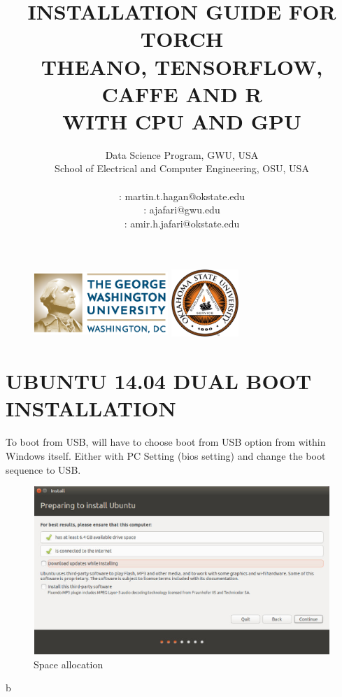 \documentclass[12pt]{article}
\title{\textbf{INSTALLATION GUIDE FOR TORCH}\\\textbf{THEANO, TENSORFLOW, CAFFE AND R}\\ \textbf{WITH CPU AND GPU}}%
\author{Data Science Program, GWU, USA \\
School of Electrical and Computer Engineering, OSU, USA\\
\vspace{1cm}\\
\Letter : martin.t.hagan@okstate.edu\\
\Letter : ajafari@gwu.edu\\
\Letter : amir.h.jafari@okstate.edu  }
\begin{document}
\begin{figure}
\centering \includegraphics[width=2in, height=1in]{fig/GW_logo.eps}\hfill
\centering \includegraphics[width=1in, height=1in]{fig/logo1.eps}\hfill
\end{figure}

\maketitle
\newpage
\tableofcontents
\newpage
\listoffigures
\newpage
\section{UBUNTU 14.04 DUAL BOOT INSTALLATION}

To boot from USB, will have to choose boot from USB option from within Windows itself. Either with PC Setting (bios setting) and change the boot sequence to USB.
\begin{figure}[h]
\centering \includegraphics[width=5.8in, height=2.5in]{fig/d1.eps}
\caption{Space allocation}
\end{figure}b
\end{document}
